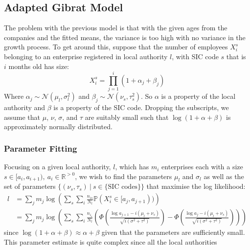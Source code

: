 \documentclass[a4paper,10pt]{article}
\begin{document}
\subsection{Adapted Gibrat Model}
The problem with the previous model is that with the given ages from the companies and the fitted means, the variance is too high with no variance in the growth process. To get around this, suppose that the number of employees  $X_i^s$ belonging to an enterprise registered in local authority $l$, with SIC code $s$ that is $i$ months old has size:
\begin{equation}
 X_i^s = \prod_{j = 1}^i(1 + \alpha_j + \beta_j)
\end{equation}
Where $\alpha_j \sim \mathcal{N}(\mu_l, \sigma^2_l)$ and $\beta_j \sim \mathcal{N}(\nu_s, \tau^2_s)$. So $\alpha$ is a property of the local authority and $\beta$ is a property of the SIC code. 
Dropping the subscripts, we assume that $\mu$, $\nu$, $\sigma$, and $\tau$ are suitably small such that $\log(1 + \alpha + \beta)$ is approximately normally distributed.
\subsubsection{Parameter Fitting}
Focusing on a given local authority, $l$, which has $m_i$ enterprises each with a size $s \in [a_i, a_{i+1}), \ a_i \in \mathbb{R}^{> 0}$, we wish to find the parameters $\mu_l$ and $\sigma_l$ as well as the set of parameters $\{(\nu_s, \tau_s) \ | \ s \in \{\text{SIC codes}\}\}$ that maximise the log likelihood:
\begin{align}
 l &= \sum_jm_j\log\left(\sum_s\sum_i\frac{n_{is}}{N_l}\mathbb{P}(X_i^s \in [a_j, a_{j+1}))\right) \\
   &= \sum_j m_j \log\left(\sum_s\sum_i\frac{n_{i_s}}{N_l}\left(\Phi\left(\frac{\log a_{j+1} - i (\mu_l + \nu_s)}{\sqrt{i (\sigma^2 + \tau^2)}} \right) - \Phi\left(\frac{\log a_{j} - i (\mu_l + \nu_s)}{\sqrt{i (\sigma^2 + \tau^2)}} \right) \right) \right)
\end{align}
since $\log(1 + \alpha + \beta) \approx \alpha + \beta$ given that the parameters are sufficiently small. This parameter estimate is quite complex since all the local authorities
\end{document}

